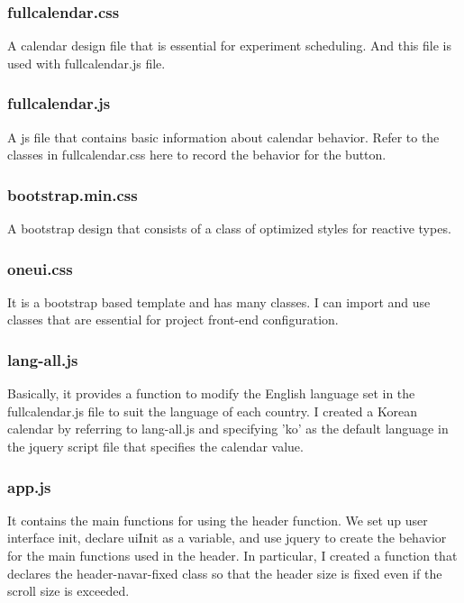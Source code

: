 \documentclass[letterpaper, 10 pt, conference]{ieeeconf}  %
\begin{document}
\subsubsection{fullcalendar.css}
A calendar design file that is essential for experiment scheduling. And this file is used with fullcalendar.js file.\\
\subsubsection{fullcalendar.js}
A js file that contains basic information about calendar behavior. Refer to the classes in fullcalendar.css here to record the behavior for the button.\\
\subsubsection{bootstrap.min.css}
A bootstrap design that consists of a class of optimized styles for reactive types.\\
\subsubsection{oneui.css}
It is a bootstrap based template and has many classes. I can import and use classes that are essential for project front-end configuration.\\
\subsubsection{lang-all.js}
Basically, it provides a function to modify the English language set in the fullcalendar.js file to suit the language of each country. I created a Korean calendar by referring to lang-all.js and specifying 'ko' as the default language in the jquery script file that specifies the calendar value.\\
\subsubsection{app.js}
It contains the main functions for using the header function. We set up user interface init, declare uiInit as a variable, and use jquery to create the behavior for the main functions used in the header. In particular, I created a function that declares the header-navar-fixed class so that the header size is fixed even if the scroll size is exceeded.\\
\end{document}
